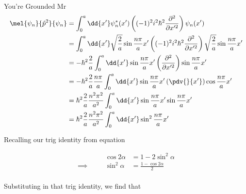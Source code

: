 \begin{answer}
\begin{answerpart}{You're Grounded Mr}
    \begin{equation}
      \begin{split}
        \mel{\psi_n}{\hat{p}^2}{\psi_n}
        &=
        \int_0^a \dd{x'}
        \psi_{n}^{*}(x')
        \left(
        (-1)^2i^2\hbar^2\frac{\partial^2}{\partial x^{\prime 2}}
        \right)
        \psi_{n}(x')\\
        &=
        \int_0^a \dd{x'}
        \sqrt{\frac{2}{a}}\sin{\frac{n\pi}{a}x'}
        \left(
        (-1)^2i^2\hbar^2\frac{\partial^2}{\partial x^{\prime 2}}
        \right)
        \sqrt{\frac{2}{a}}\sin{\frac{n\pi}{a}x'}
        \\
        &=
        -\hbar^2
        \frac{2}{a}
        \int_0^a \dd{x'}
        \sin{\frac{n\pi}{a}x'}
        \left(
        \frac{\partial^2}{\partial x^{\prime 2}}
        \right)
        \sin{\frac{n\pi}{a}x'}
        \\
        &=
        -\hbar^2
        \frac{2}{a}
        \frac{n\pi}{a}
        \int_0^a \dd{x'}
        \sin{\frac{n\pi}{a}x'}
        \left(
        \pdv{}{x'}
        \right)
        \cos{\frac{n\pi}{a}x'}
        \\
        &=
        \hbar^2
        \frac{2}{a}
        \frac{n^2\pi^2}{a^2}
        \int_0^a \dd{x'}
        \sin{\frac{n\pi}{a}x'}
        \sin{\frac{n\pi}{a}x'}
        \\
        &=
        \hbar^2
        \frac{2}{a}
        \frac{n^2\pi^2}{a^2}
        \int_0^a \dd{x'}
        \sin^2{\frac{n\pi}{a}x'}
        \\
      \end{split}
    \end{equation}

    Recalling our trig identity from equation 

    \begin{equation}
      \begin{alignedat}{2}
        & & 
        \cos{2\alpha}
        &= 1 - 2\sin^2{\alpha}\\
        \implies \quad & &
        \sin^2{\alpha} &= \frac{1 - \cos{2\alpha}}{2}\\
      \end{alignedat}
    \end{equation}

    Substituting in that trig identity, we find that


\end{answerpart}
\end{answer}
